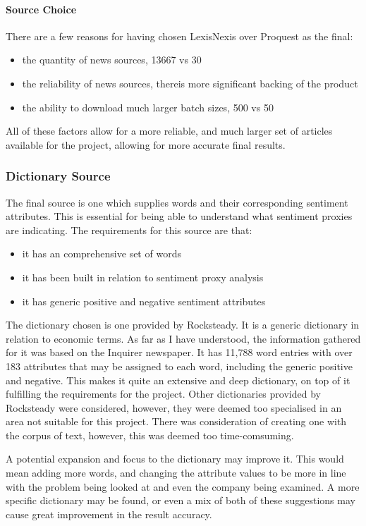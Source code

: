 \paragraph{Source Choice}

There are a few reasons for having chosen LexisNexis over Proquest as the final:
\begin{itemize}
    \item the quantity of news sources, 13667 vs 30
    \item the reliability of news sources, thereis more significant backing of the product
    \item the ability to download much larger batch sizes, 500 vs 50
\end{itemize}
All of these factors allow for a more reliable, and much larger set of articles available for the project, allowing for more accurate final results.

\subsubsection{Dictionary Source}

The final source is one which supplies words and their corresponding sentiment attributes. This is essential for being able to understand what sentiment proxies are indicating. The requirements for this source are that:
\begin{itemize}
    \item it has an comprehensive set of words
    \item it has been built in relation to sentiment proxy analysis
    \item it has generic positive and negative sentiment attributes
\end{itemize}
The dictionary chosen is one provided by Rocksteady. It is a generic dictionary in relation to economic terms. As far as I have understood, the information gathered for it was based on the Inquirer newspaper. It has 11,788 word entries with over 183 attributes that may be assigned to each word, including the generic positive and negative. This makes it quite an extensive and deep dictionary, on top of it fulfilling the requirements for the project. Other dictionaries provided by Rocksteady were considered, however, they were deemed too specialised in an area not suitable for this project. There was consideration of creating one with the corpus of text, however, this was deemed too time-comsuming.

A potential expansion and focus to the dictionary may improve it. This would mean adding more words, and changing the attribute values to be more in line with the problem being looked at and even the company being examined. A more specific dictionary may be found, or even a mix of both of these suggestions may cause great improvement in the result accuracy.

